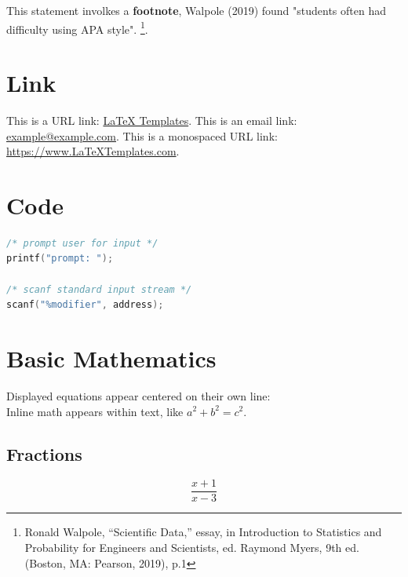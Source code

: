 \documentclass[
12pt, %
a4paper, %
fleqn,   %
]{notes}
\begin{document}
This statement involkes a \textbf{footnote}, Walpole (2019) found "students
often had difficulty using APA style". \footnote{Ronald Walpole, “Scientific
Data,” essay, in Introduction to Statistics and Probability for Engineers and
Scientists, ed. Raymond Myers, 9th ed. (Boston, MA: Pearson, 2019), p.1}.


\section{Link}

This is a URL link: \href{https://www.latextemplates.com}{LaTeX Templates}. This
is an email link: \href{mailto:example@example.com}{example@example.com}. This
is a monospaced URL link: \url{https://www.LaTeXTemplates.com}.


\section{Code}
\begin{lstlisting}[language=C]
/* prompt user for input */
printf("prompt: ");

/* scanf standard input stream */
scanf("%modifier", address);
\end{lstlisting}




\section{Basic Mathematics}
Displayed equations appear centered on their own line: \\
Inline math appears within text, like $a^2 + b^2 = c^2$.


\subsection{Fractions}
\[
\frac{x + 1}{x - 3}
\]
\end{document}
